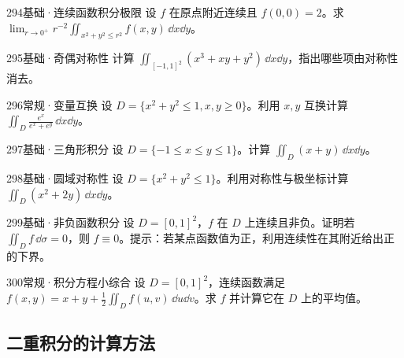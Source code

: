\begin{exercise}{294}{基础·连续函数积分极限}
设 $f$ 在原点附近连续且 $f(0,0)=2$。求 $\lim_{r\to0^+}r^{-2}\iint_{x^2+y^2\leq r^2}f(x,y)\,\dd x\dd y$。
\end{exercise}
\begin{exercise}{295}{基础·奇偶对称性}
计算 $\iint_{[-1,1]^2}(x^3+xy+y^2)\,\dd x\dd y$，指出哪些项由对称性消去。
\end{exercise}
\begin{exercise}{296}{常规·变量互换}
设 $D=\{x^2+y^2\leq1,x,y\geq0\}$。利用 $x,y$ 互换计算 $\iint_D\frac{e^x}{e^x+e^y}\,\dd x\dd y$。
\end{exercise}
\begin{exercise}{297}{基础·三角形积分}
设 $D=\{-1\leq x\leq y\leq1\}$。计算 $\iint_D(x+y)\,\dd x\dd y$。
\end{exercise}
\begin{exercise}{298}{基础·圆域对称性}
设 $D=\{x^2+y^2\leq1\}$。利用对称性与极坐标计算 $\iint_D(x^2+2y)\,\dd x\dd y$。
\end{exercise}
\begin{exercise}{299}{基础·非负函数积分}
设 $D=[0,1]^2$，$f$ 在 $D$ 上连续且非负。证明若 $\iint_D f\,\dd\sigma=0$，则 $f\equiv0$。提示：若某点函数值为正，利用连续性在其附近给出正的下界。
\end{exercise}
\begin{exercise}{300}{常规·积分方程小综合}
设 $D=[0,1]^2$，连续函数满足 $f(x,y)=x+y+\frac12\iint_D f(u,v)\,\dd u\dd v$。求 $f$ 并计算它在 $D$ 上的平均值。
\end{exercise}

\subsection{二重积分的计算方法}
